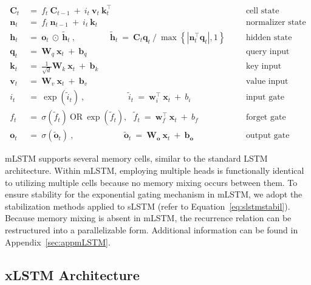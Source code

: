 \begin{align}
\label{eq:mlstm_recurrent_begin}
\mathbf{C}_t \ &= \  f_t \ \mathbf{C}_{t-1} \ + \ 
  i_t \ \mathbf{v}_t \ \mathbf{k}_t^\top & &  &\text{cell state} \\
\mathbf{n}_t \ &= \  f_t \ \mathbf{n}_{t-1} \ + \ 
  i_t \ \mathbf{k}_t & &  &\text{normalizer state} \\
\mathbf{h}_t  \ &= \ \mathbf{o}_t \ \odot \ \tilde{\mathbf{h}}_t
\ , \qquad \qquad 
\tilde{\mathbf{h}}_t \ = \   \mathbf{C}_t \mathbf{q}_t \ / \ 
  \max \left\{ |\mathbf{n}_t^\top \mathbf{q}_t|, 1 \right\} 
   &&&\text{hidden state} \\
\mathbf{q}_t \ &= \ \mathbf{W}_q \ \mathbf{x}_t \ + \ \mathbf{b}_q  & &  &\text{query input} \\
\mathbf{k}_t \ &= \ \frac{1}{\sqrt{d}} \mathbf{W}_k \ \mathbf{x}_t \ + \ \mathbf{b}_k  & &  &\text{key input} \\
\mathbf{v}_t \ &= \ \mathbf{W}_v \ \mathbf{x}_t \ + \ \mathbf{b}_v  & &  &\text{value input} \\
i_t \ &= \ \!\exp \!  \! \left( \tilde{i}_t  \right) \ , 
 \qquad \qquad \ \ \ \ \,
  \tilde{i}_t \ = \ \mathbf{w}^\top_{i} \ \mathbf{x}_t \ + \  b_{i} \ \ \ 
  &&&\text{input gate} \\
f_t \ &= \ \sigma \!  \left(  \tilde{f}_t \right) \ \text{OR} \ \!\exp \!  \! \left(  \tilde{f}_t \right) , \ \ \: \!
\tilde{f}_t \ = \ \mathbf{w}^\top_{f} \ \mathbf{x}_t  \ + \
  b_{f}
  &&& \text{forget gate} \\
\label{eq:mlstm_recurrent_end}
\mathbf{o}_t \ &= \ \sigma \left( \tilde{\mathbf{o}}_t \right) \ , \qquad \qquad \quad \ \ \ \,
  \tilde{\mathbf{o}}_t  \ = \ \mathbf{W}_{\mathbf{o}} \ \mathbf{x}_t \ + \
  \mathbf{b}_{\mathbf{o}}
  &&&\text{output gate} 
\end{align}

mLSTM supports several memory cells, similar to the standard LSTM architecture. Within mLSTM, employing multiple heads is functionally identical to utilizing multiple cells because no memory mixing occurs between them. To ensure stability for the exponential gating mechanism in mLSTM, we adopt the stabilization methods applied to sLSTM (refer to Equation~\ref{eq:slstmstabil}). Because memory mixing is absent in mLSTM, the recurrence relation can be restructured into a parallelizable form. Additional information can be found in Appendix~\ref{sec:appmLSTM}.

\subsection{xLSTM Architecture}
\label{sec:xLSTMarch}

